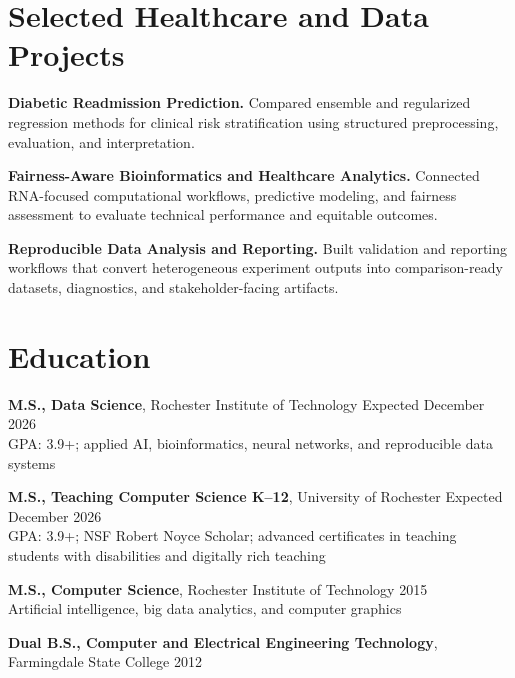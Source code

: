 \documentclass[10pt,letterpaper]{article}
\begin{document}
\section*{Selected Healthcare and Data Projects}
\textbf{Diabetic Readmission Prediction.}
Compared ensemble and regularized regression methods for clinical risk
stratification using structured preprocessing, evaluation, and interpretation.

\textbf{Fairness-Aware Bioinformatics and Healthcare Analytics.}
Connected RNA-focused computational workflows, predictive modeling, and
fairness assessment to evaluate technical performance and equitable outcomes.

\textbf{Reproducible Data Analysis and Reporting.}
Built validation and reporting workflows that convert heterogeneous experiment
outputs into comparison-ready datasets, diagnostics, and stakeholder-facing
artifacts.

\section*{Education}
\textbf{M.S., Data Science}, Rochester Institute of Technology
\hfill Expected December 2026\\
GPA: 3.9+; applied AI, bioinformatics, neural networks, and reproducible data systems

\textbf{M.S., Teaching Computer Science K--12}, University of Rochester
\hfill Expected December 2026\\
GPA: 3.9+; NSF Robert Noyce Scholar; advanced certificates in teaching students
with disabilities and digitally rich teaching

\textbf{M.S., Computer Science}, Rochester Institute of Technology
\hfill 2015\\
Artificial intelligence, big data analytics, and computer graphics

\textbf{Dual B.S., Computer and Electrical Engineering Technology}, Farmingdale State College
\hfill 2012
\end{document}
